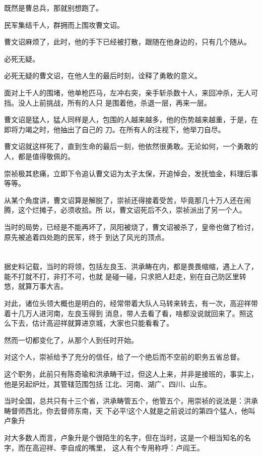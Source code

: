 \documentclass[11pt,a4paper,onecolumn]{article}
\begin{document}
既然是曹总兵，那就别想跑了。

民军集结千人，群拥而上围攻曹文诏。

曹文诏麻烦了，此时，他的手下已经被打散，跟随在他身边的，只有几个随从。

必死无疑。

必死无疑的曹文诏，在他人生的最后时刻，诠释了勇敢的意义。

面对上千人的围堵，他单枪匹马，左冲右突，亲手斩杀数十人，来回冲杀，无人可挡。没人上前挑战，所有的人只
是围着他，杀退一层，再来一层。

曹文诏是猛人，猛人同样是人，包围的人越来越多，他的伤势越来越重，于是，在即将力竭之时，他抽出了自己的
刀。在所有人的注视下，他举刀自尽。

曹文诏就这样死了，直到生命的最后一刻，他依然很勇敢。无论如何，一个勇敢的人，都是值得敬佩的。

崇祯极其悲痛，立即下令追认曹文诏为太子太保，开追悼会，发抚恤金，料理后事等等。

从某个角度讲，曹文诏算是解脱了，崇祯还得接着受苦，毕竟那几十万人还在闹腾，这个烂摊子，必须收拾。所
以，曹文诏死后不久，崇祯派出了另一个人。

当时的局势，已经是不能再坏了，凤阳被烧了，曹文诏被杀了，皇帝也做了检讨，原先被追着四处跑的民军，终于
到达了风光的顶点。

\section[\thesection]{}

据史料记载，当时的将领，包括左良玉、洪承畴在内，都是畏畏缩缩，遇上人了，能不打就不打，非打不可，也就
是碰一碰，只求把人赶走，别在自己防区里转悠，就算万事大吉。

对此，诸位头领大概也是明白的，经常带着大队人马转来转去，有一次，高迎祥带着十几万人进河南，左良玉得到
消息，带人去看了看，啥都没说就回来了。照这么下去，估计高迎祥就算进京城，大家也只能看看了。

然而一切都变化了，从那个人到任时开始。

对这个人，崇祯给予了充分的信任，给了一个绝后而不空前的职务\myrule 五省总督。

这个职务，此前只有陈奇瑜和洪承畴干过，但这人上来，并非是接班的，事实上，他是另起炉灶，其管辖范围包括
江北、河南、湖广、四川、山东。

当时全国，总共只有十三个省，洪承畴管五个，他管五个，用崇祯的说法是：洪承畴督师西北，你去督师东南，天
下必平!这个人就是之前说过的第四个猛人，他叫卢象升

对大多数人而言，卢象升是个很陌生的名字，但在当时，这是一个相当知名的名字，而在高迎祥、李自成的嘴里，
这人有个专用称呼：卢阎王。
\end{document}
